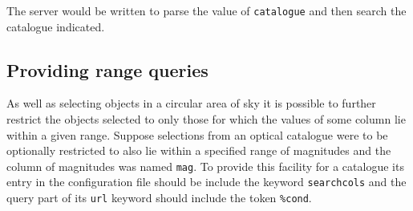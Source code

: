 \documentclass[twoside,11pt]{article}
\renewcommand{\_}{\texttt{\symbol{95}}}
\begin{document}
The server would be written to parse the value of {\tt catalogue} and then
search the catalogue indicated.

\subsection{Providing range queries}

As well as selecting objects in a circular area of sky it is possible
to further restrict the objects selected to only those for which the
values of some column lie within a given range.  Suppose selections
from an optical catalogue were to be optionally restricted to also
lie within a specified range of magnitudes and the column of magnitudes
was named {\tt mag}.  To provide this facility for a catalogue its entry in
the configuration file should be include the keyword {\tt search\_cols}
and the query part of its {\tt url} keyword should include the token
{\tt \%cond}.
\end{document}
